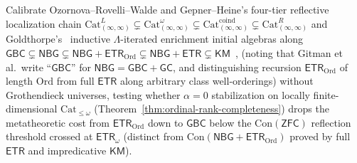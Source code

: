\begin{problem}\label{prob:open-16}
Calibrate Ozornova--Rovelli--Walde and Gepner--Heine's four-tier reflective localization chain $\mathrm{Cat}^L_{(\infty,\infty)} \subsetneq \mathrm{Cat}^\omega_{(\infty,\infty)} \subsetneq \mathrm{Cat}^{\mathrm{coind}}_{(\infty,\infty)} \subsetneq \mathrm{Cat}^R_{(\infty,\infty)}$ \cite{ORW26,GepnerHeine26} and Goldthorpe's~\cite{Goldthorpe23} inductive $\Lambda$-iterated enrichment initial algebras along $\mathsf{GBC} \subsetneq \mathsf{NBG} \subsetneq \mathsf{NBG}+\mathsf{ETR}_{\mathrm{Ord}} \subsetneq \mathsf{NBG}+\mathsf{ETR} \subsetneq \mathsf{KM}$~\cite[Thm.~1.2]{Gitman20}, \cite{Williams18} (noting that Gitman et al.\ write ``$\mathsf{GBC}$'' for $\mathsf{NBG} = \mathsf{GBC} + \mathsf{GC}$, and distinguishing recursion $\mathsf{ETR}_{\mathrm{Ord}}$ of length $\mathrm{Ord}$ from full $\mathsf{ETR}$ along arbitrary class well-orderings) without Grothendieck universes, testing whether $\alpha = 0$ stabilization on locally finite-dimensional $\mathrm{Cat}_{\le \omega}$ (Theorem~\ref{thm:ordinal-rank-completeness}) drops the metatheoretic cost from $\mathsf{ETR}_{\mathrm{Ord}}$ down to $\mathsf{GBC}$ below the $\mathrm{Con}(\mathsf{ZFC})$ reflection threshold crossed at $\mathsf{ETR}_\omega$ (distinct from $\mathrm{Con}(\mathsf{NBG}+\mathsf{ETR}_{\mathrm{Ord}})$ proved by full $\mathsf{ETR}$ and impredicative $\mathsf{KM}$).
\end{problem}

